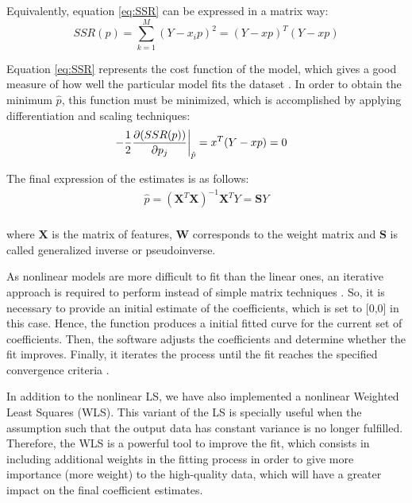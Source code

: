 \documentclass[a4paper, report, oneside, UKenglish]{memoir}
\begin{document}
Equivalently, equation \eqref{eq:SSR} can be expressed in a matrix way:
\begin{equation}
    SSR(p) = \sum\limits_{k=1}^{M}(Y - x_{i}p)^2 = (Y - xp)^T(Y - xp)
\end{equation}

Equation \eqref{eq:SSR} represents the cost function of the model, which gives a good measure of how well the particular model fits the dataset \cite{MachLearnRefined}. In order to obtain the minimum $\hat{p}$, this function must be minimized, which is accomplished by applying differentiation and scaling techniques:
\begin{equation}
\begin{split}
    \left.-\frac{1}{2}\pdv{(SSR(p))}{p_{j}}\right|_{\substack{\hat{p}}} &= x^{T}(Y - xp) = 0
\end{split}
\end{equation}

The final expression of the estimates is as follows:
\begin{equation}\label{eq:estimatorLS}
\begin{split}
    \hat{p} = (\textbf{X}^{T}\textbf{X})^{-1}\textbf{X}^{T}Y = \textbf{S}Y\\
\end{split}
\end{equation}

where $\textbf{X}$ is the matrix of features, $\textbf{W}$ corresponds to the weight matrix and $\textbf{S}$ is called generalized inverse or pseudoinverse.

As nonlinear models are more difficult to fit than the linear ones, an iterative approach is required to perform instead of simple matrix techniques \cite{MathWorksRegression}. So, it is necessary to provide an initial estimate of the coefficients, which is set to [0,0] in this case. Hence, the function produces a initial fitted curve for the current set of coefficients. Then, the software adjusts the coefficients and determine whether the fit improves. Finally, it iterates the process until the fit reaches the specified convergence criteria \cite{MathWorksRegression}. 

In addition to the nonlinear LS, we have also implemented a nonlinear Weighted Least Squares (WLS). This variant of the LS is specially useful when the assumption such that the output data has constant variance is no longer fulfilled. Therefore, the WLS is a powerful tool to improve the fit, which consists in including additional weights in the fitting process in order to give more importance (more weight) to the high-quality data, which will have a greater impact on the final coefficient estimates. 
\end{document}
